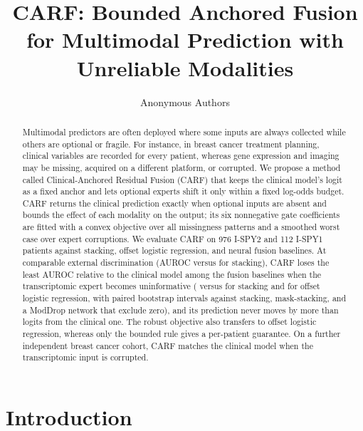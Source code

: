 \documentclass[runningheads]{llncs}
\begin{document}
\title{CARF: Bounded Anchored Fusion for Multimodal Prediction with Unreliable Modalities}
\author{Anonymous Authors}
\maketitle

\begin{abstract}
Multimodal predictors are often deployed where some inputs are always collected while others are optional or fragile. For instance, in breast cancer treatment planning, clinical variables are recorded for every patient, whereas gene expression and imaging may be missing, acquired on a different platform, or corrupted. We propose a method called Clinical-Anchored Residual Fusion (CARF) that keeps the clinical model's logit as a fixed anchor and lets optional experts shift it only within a fixed log-odds budget. CARF returns the clinical prediction exactly when optional inputs are absent and bounds the effect of each modality on the output; its six nonnegative gate coefficients are fitted with a convex objective over all missingness patterns and a smoothed worst case over expert corruptions. We evaluate CARF on 976 I-SPY2 and 112 I-SPY1 patients against stacking, offset logistic regression, and neural fusion baselines. At comparable external discrimination (AUROC \ExtCarf{} versus \ExtStack{} for stacking), CARF loses the least AUROC relative to the clinical model among the fusion baselines when the transcriptomic expert becomes uninformative (\RnaPermCarf{} versus \RnaPermStack{} for stacking and \RnaPermOffset{} for offset logistic regression, with paired bootstrap intervals against stacking, mask-stacking, and a ModDrop network that exclude zero), and its prediction never moves by more than \MaxDispCarfAll{} logits from the clinical one. The robust objective also transfers to offset logistic regression, whereas only the bounded rule gives a per-patient guarantee. On a further independent breast cancer cohort, CARF matches the clinical model when the transcriptomic input is corrupted.
\end{abstract}

\section{Introduction}
\end{document}
